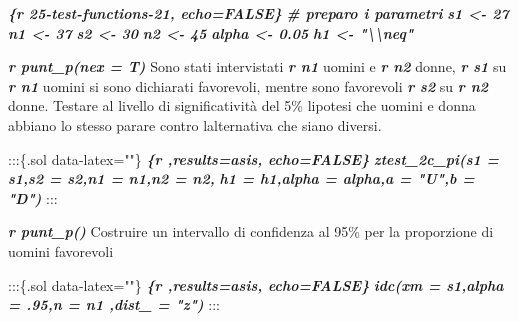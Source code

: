 \documentclass[
  11pt,
]{book}
\newenvironment{Shaded}{\begin{snugshade}}{\end{snugshade}}
\newcommand{\InformationTok}[1]{\textcolor[rgb]{0.56,0.35,0.01}{\textbf{\textit{#1}}}}
\newcommand{\NormalTok}[1]{#1}
\theoremstyle{mytheoremstyle}
\theoremstyle{mydefstyle}
\begin{document}
\begin{Shaded}
\begin{Highlighting}[]
\InformationTok{\textasciigrave{}\textasciigrave{}\textasciigrave{}\{r 25{-}test{-}functions{-}21, echo=FALSE\} }
\InformationTok{\# preparo i parametri}
\InformationTok{s1 \textless{}{-} 27}
\InformationTok{n1 \textless{}{-} 37}
\InformationTok{s2 \textless{}{-} 30}
\InformationTok{n2 \textless{}{-} 45}
\InformationTok{alpha \textless{}{-} 0.05}
\InformationTok{h1 \textless{}{-} "\textbackslash{}\textbackslash{}neq"}
\InformationTok{\textasciigrave{}\textasciigrave{}\textasciigrave{}}

\InformationTok{\textasciigrave{}r punt\_p(nex = T)\textasciigrave{}}\NormalTok{ Sono stati intervistati }\InformationTok{\textasciigrave{}r n1\textasciigrave{}}\NormalTok{ uomini }
\NormalTok{e }\InformationTok{\textasciigrave{}r n2\textasciigrave{}}\NormalTok{ donne, }\InformationTok{\textasciigrave{}r s1\textasciigrave{}}\NormalTok{ su }\InformationTok{\textasciigrave{}r n1\textasciigrave{}}\NormalTok{ uomini si sono }
\NormalTok{dichiarati favorevoli, mentre sono favorevoli }\InformationTok{\textasciigrave{}r s2\textasciigrave{}}\NormalTok{ su }\InformationTok{\textasciigrave{}r n2\textasciigrave{}} 
\NormalTok{donne. Testare al livello di significatività del 5\% l\textquotesingle{}ipotesi che uomini e }
\NormalTok{donna abbiano lo stesso parare contro l\textquotesingle{}alternativa che siano diversi.}

\NormalTok{:::\{.sol data{-}latex=""\}}
\InformationTok{\textasciigrave{}\textasciigrave{}\textasciigrave{}\{r ,results=\textquotesingle{}asis\textquotesingle{}, echo=FALSE\} }
\InformationTok{ztest\_2c\_pi(s1 = s1,s2 = s2,n1 = n1,n2 = n2,}
\InformationTok{                h1 = h1,alpha = alpha,a = "U",b = "D")}
\InformationTok{\textasciigrave{}\textasciigrave{}\textasciigrave{}}
\NormalTok{:::}

\InformationTok{\textasciigrave{}r punt\_p()\textasciigrave{}}\NormalTok{ Costruire un intervallo di confidenza al 95\% per }
\NormalTok{la proporzione di uomini favorevoli}

\NormalTok{:::\{.sol data{-}latex=""\}}
\InformationTok{\textasciigrave{}\textasciigrave{}\textasciigrave{}\{r ,results=\textquotesingle{}asis\textquotesingle{}, echo=FALSE\} }
\InformationTok{idc(xm = s1,alpha = .95,n = n1 ,dist\_ = "z")}
\InformationTok{\textasciigrave{}\textasciigrave{}\textasciigrave{}}
\NormalTok{:::}
\end{Highlighting}
\end{Shaded}
\end{document}
